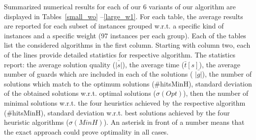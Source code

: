 \documentclass[runningheads,a4paper]{elsarticle}
\begin{document}
        
         Summarized numerical results for each of our 6 variants of our algorithm are displayed 
         in Tables~\ref{small_wo} --\ref{large_w1}. For each table, the average results are reported for each subset of instances grouped w.r.t. a specific kind of instances and a specific weight (97 instances per each group). Each of the tables list the considered algorithms in the first column. Starting with column two,  each of the lines provide detailed statistics for respective algorithm.  The statistics report: the average solution quality ($\bar{|s|}$), the average time ($\bar{t}[s]$), the average number of guards which are included in each of the solutions ( $\bar{|g|}$), the number of solutions which match to the optimum solutions (\#hitsMinH), standard deviation of the obtained solutions w.r.t. optimal solutions ($\sigma(Opt)$), then the number of minimal solutions w.r.t. the four heuristics achieved by the respective algorithm (\#hitsMinH), standard deviation w.r.t. best solutions achieved by the four heuristic algorithms   ($\sigma(MinH)$).  An asterisk in front of a number means that the exact approach  could prove optimality in all cases.      
         
    
     \begin{table}[]
     	\centering
        \caption{The results on the benchmark set $MinArea$ for the type of weight $W0$.}\label{small_wo}
     \end{table}
 
\end{document}
